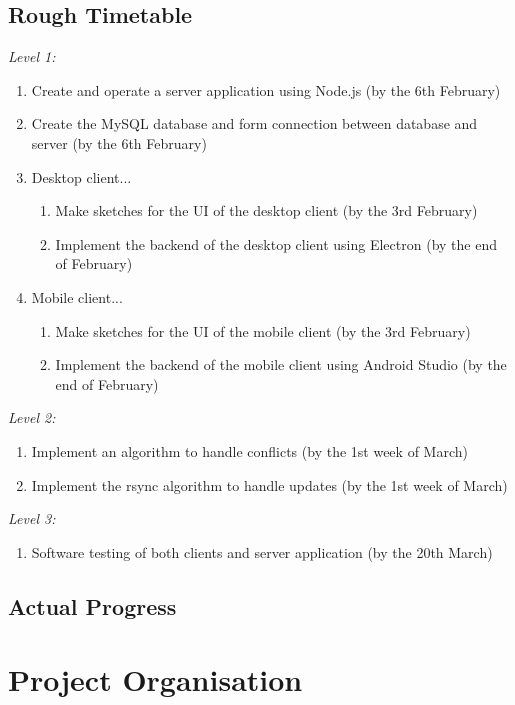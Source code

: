 \documentclass{article}
\begin{document}
	\subsection{Rough Timetable}
	\textit{Level 1:}
	\begin{enumerate}
	\item Create and operate a server application using Node.js (by the 6th February)
	\item Create the MySQL database and form connection between database and server (by the 6th February)
	\item Desktop client...
		\begin{enumerate}
		\item Make sketches for the UI of the desktop client (by the 3rd February)
		\item Implement the backend of the desktop client using Electron (by the end of February)
		\end{enumerate}
	\item Mobile client...
		\begin{enumerate}
		\item  Make sketches for the UI of the mobile client (by the 3rd February)
		\item  Implement the backend of the mobile client using Android Studio (by the end of February)
		\end{enumerate}
	\end{enumerate}
	\textit{Level 2:}
	\begin{enumerate}
	\item Implement an algorithm to handle conflicts (by the 1st week of March)
	\item Implement the rsync algorithm to handle updates (by the 1st week of March)
	\end{enumerate}
	\textit{Level 3:}
	\begin{enumerate}
	\item Software testing of both clients and server application (by the 20th March)
	\end{enumerate}

	\subsection{Actual Progress}

\section{Project Organisation}
\end{document}
